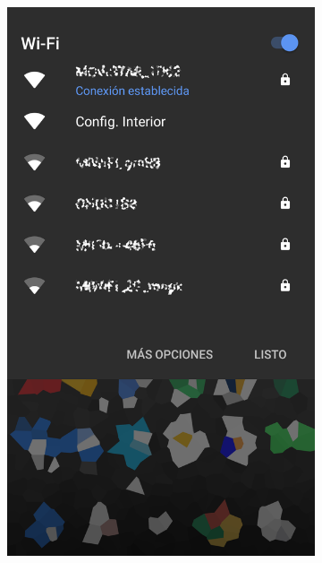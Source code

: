 \begin{figure}
\begin{subfigure}{0.49\columnwidth}
  \centering
  \includegraphics[width=1\columnwidth,frame]{images/interior-select-wifi}
  \caption{}
  \label{fig:interior-select-wifi}
\end{subfigure}
\hfill
\begin{subfigure}{0.49\columnwidth}
  \centering

\end{subfigure}
\end{figure}
